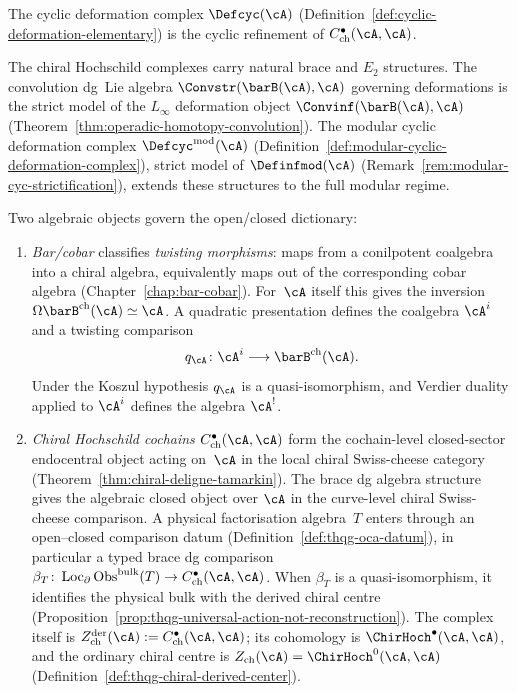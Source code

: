 The cyclic deformation complex $\Defcyc(\cA)$
(Definition~\ref{def:cyclic-deformation-elementary}) is the cyclic
refinement of $C^\bullet_{\mathrm{ch}}(\cA,\cA)$.

The chiral Hochschild complexes
carry natural brace and $E_2$ structures. The convolution dg~Lie
algebra $\Convstr(\barB(\cA), \cA)$ governing deformations is the
strict model of the $L_\infty$ deformation object
$\Convinf(\barB(\cA), \cA)$
(Theorem~\ref{thm:operadic-homotopy-convolution}).
The modular cyclic deformation complex
$\Defcyc^{\mathrm{mod}}(\cA)$
(Definition~\ref{def:modular-cyclic-deformation-complex}),
strict model of $\Definfmod(\cA)$
(Remark~\ref{rem:modular-cyc-strictification}),
extends these structures to the full modular regime.

Two algebraic objects govern the open/closed dictionary:
\begin{enumerate}[label=\textup{(\alph*)}]
\item \emph{Bar/cobar} classifies \emph{twisting morphisms}:
 maps from a conilpotent coalgebra into a chiral algebra, equivalently
 maps out of the corresponding cobar algebra
 (Chapter~\ref{chap:bar-cobar}). For~$\cA$ itself this gives the
 inversion $\Omega\barB^{\mathrm{ch}}(\cA)\simeq \cA$.  A quadratic
 presentation defines the coalgebra $\cA^i$ and a twisting comparison
 \[
 q_\cA\colon\cA^i\longrightarrow\barB^{\mathrm{ch}}(\cA).
 \]
 Under the Koszul hypothesis $q_\cA$ is a quasi-isomorphism, and
 Verdier duality applied to $\cA^i$ defines the algebra $\cA^!$.
\item \emph{Chiral Hochschild cochains}
 $C^\bullet_{\mathrm{ch}}(\cA, \cA)$ form the cochain-level
 closed-sector endocentral object acting on~$\cA$ in the local
 chiral Swiss-cheese category
 (Theorem~\ref{thm:chiral-deligne-tamarkin}). The brace dg algebra
 structure gives the algebraic closed object over $\cA$ in the
 curve-level chiral Swiss-cheese comparison.  A physical
 factorisation algebra~$T$ enters through an open--closed comparison datum
 \textup{(}Definition~\ref{def:thqg-oca-datum}\textup{)}, in
 particular a typed brace dg comparison
 $\beta_T\colon \operatorname{Loc}_{\partial}
 \operatorname{Obs}^{\mathrm{bulk}}(T)
 \to C^\bullet_{\mathrm{ch}}(\cA,\cA)$.  When $\beta_T$ is a
 quasi-isomorphism, it identifies the physical bulk with the
 derived chiral centre
 (Proposition~\ref{prop:thqg-universal-action-not-reconstruction}).
 The complex itself is
 $Z^{\mathrm{der}}_{\mathrm{ch}}(\cA):=
 C^\bullet_{\mathrm{ch}}(\cA,\cA)$; its cohomology is
 $\ChirHoch^\bullet(\cA,\cA)$, and the ordinary chiral centre is
 $Z_{\mathrm{ch}}(\cA)=\ChirHoch^0(\cA,\cA)$
 (Definition~\ref{def:thqg-chiral-derived-center}).
\end{enumerate}

